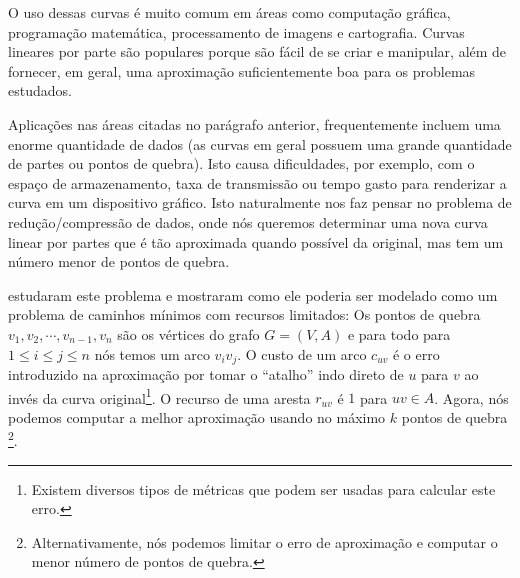 O uso dessas curvas é muito comum em áreas como computação gráfica, 
programação matemática, processamento de imagens e cartografia. Curvas 
lineares por parte são populares porque são fácil de se criar e 
manipular, além de fornecer, em geral, uma aproximação suficientemente 
boa para os problemas estudados.

Aplicações nas áreas citadas no parágrafo anterior, frequentemente 
incluem uma enorme quantidade de dados (as curvas em geral possuem uma 
grande quantidade de partes ou pontos de quebra). Isto causa 
dificuldades, por exemplo, com o espaço de armazenamento, taxa de 
transmissão ou tempo gasto para renderizar a curva em um dispositivo 
gráfico. Isto naturalmente nos faz pensar no problema de 
redução/compressão de dados, onde nós queremos determinar uma nova curva 
linear por partes que é tão aproximada quando possível da original, mas 
tem um número menor de pontos de quebra.

\citet{dahl:96, nygaard:98} estudaram este problema e mostraram como ele 
poderia ser modelado como um problema de caminhos mínimos com recursos 
limitados: Os pontos de quebra $v_1, v_2, \cdots, v_{n-1}, v_n$ são os 
vértices do grafo $G = (V, A)$ e para todo para $1 \leq i \leq j \leq n$ 
nós temos um arco $v_iv_j$. O custo de um arco $c_{uv}$ é o erro 
introduzido na aproximação por tomar o ``atalho'' indo direto de $u$ 
para $v$ ao invés da curva original\footnote{Existem diversos tipos de 
métricas que podem ser usadas para calcular este erro.}. O recurso de 
uma aresta $r_{uv}$ é $1$ para $uv \in A$.  Agora, nós podemos computar 
a melhor aproximação usando no máximo $k$ pontos de quebra 
\footnote{Alternativamente, nós podemos limitar o erro de aproximação e 
computar o menor número de pontos de quebra.}.

